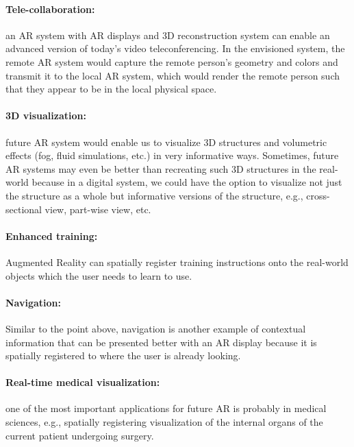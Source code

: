 \paragraph{Tele-collaboration:} an AR system with AR displays and 3D reconstruction system can enable an advanced version of today’s video teleconferencing. 
In the envisioned system, the remote AR system would capture the remote person’s geometry and colors and transmit it to the local AR system, which would render the remote person such that they appear to be in the local physical space. 
\paragraph{3D visualization:} future AR system would enable us to visualize 3D structures and volumetric effects (fog, fluid simulations, etc.) in very informative ways. 
Sometimes, future AR systems may even be better than recreating such 3D structures in the real-world because in a digital system, we could have the option to visualize not just the structure as a whole but informative versions of the structure, e.g., cross-sectional view, part-wise view, etc. 
\paragraph{Enhanced training:} Augmented Reality can spatially register training instructions onto the real-world objects which the user needs to learn to use. 
\paragraph{Navigation:} Similar to the point above, navigation is another example of contextual information that can be presented better with an AR display because it is spatially registered to where the user is already looking.
\paragraph{Real-time medical visualization:} one of the most important applications for future AR is probably in medical sciences, e.g., spatially registering visualization of the internal organs of the current patient undergoing surgery.

